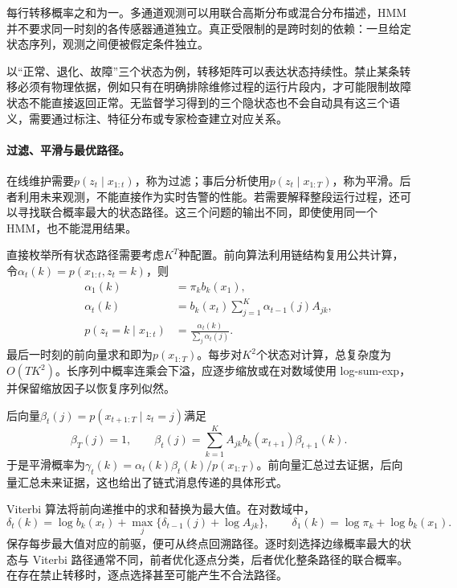 每行转移概率之和为一。多通道观测可以用联合高斯分布或混合分布描述，HMM 并不要求同一时刻的各传感器通道独立。真正受限制的是跨时刻的依赖：一旦给定状态序列，观测之间便被假定条件独立。

以“正常、退化、故障”三个状态为例，转移矩阵可以表达状态持续性。禁止某条转移必须有物理依据，例如只有在明确排除维修过程的运行片段内，才可能限制故障状态不能直接返回正常。无监督学习得到的三个隐状态也不会自动具有这三个语义，需要通过标注、特征分布或专家检查建立对应关系。

\paragraph{过滤、平滑与最优路径。}
在线维护需要$p(z_t\mid x_{1:t})$，称为过滤；事后分析使用$p(z_t\mid x_{1:T})$，称为平滑。后者利用未来观测，不能直接作为实时告警的性能。若需要解释整段运行过程，还可以寻找联合概率最大的状态路径。这三个问题的输出不同，即使使用同一个 HMM，也不能混用结果。

直接枚举所有状态路径需要考虑$K^T$种配置。前向算法利用链结构复用公共计算，令$\alpha_t(k)=p(x_{1:t},z_t=k)$，则
\begin{align}
 \alpha_1(k)&=\pi_kb_k(x_1),\\
 \alpha_t(k)&=b_k(x_t)\sum_{j=1}^{K}\alpha_{t-1}(j)A_{jk},\\
 p(z_t=k\mid x_{1:t})&=\frac{\alpha_t(k)}{\sum_j\alpha_t(j)}.
\end{align}
最后一时刻的前向量求和即为$p(x_{1:T})$。每步对$K^2$个状态对计算，总复杂度为$O(TK^2)$。长序列中概率连乘会下溢，应逐步缩放或在对数域使用 log-sum-exp，并保留缩放因子以恢复序列似然。

后向量$\beta_t(j)=p(x_{t+1:T}\mid z_t=j)$满足
\begin{equation}
 \beta_T(j)=1,\qquad
 \beta_t(j)=\sum_{k=1}^{K}A_{jk}b_k(x_{t+1})\beta_{t+1}(k).
\end{equation}
于是平滑概率为$\gamma_t(k)=\alpha_t(k)\beta_t(k)/p(x_{1:T})$。前向量汇总过去证据，后向量汇总未来证据，这也给出了链式消息传递的具体形式。

Viterbi 算法将前向递推中的求和替换为最大值。在对数域中，
\begin{equation}
 \delta_t(k)=\log b_k(x_t)+\max_j\{\delta_{t-1}(j)+\log A_{jk}\},
 \qquad \delta_1(k)=\log\pi_k+\log b_k(x_1).
\end{equation}
保存每步最大值对应的前驱，便可从终点回溯路径。逐时刻选择边缘概率最大的状态与 Viterbi 路径通常不同，前者优化逐点分类，后者优化整条路径的联合概率。在存在禁止转移时，逐点选择甚至可能产生不合法路径。

